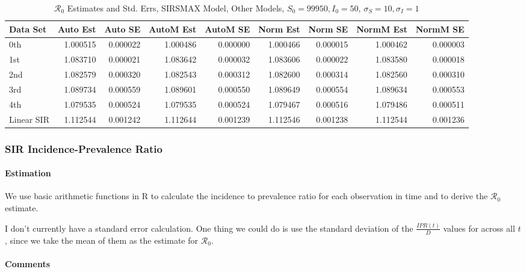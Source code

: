 \documentclass[12pt]{article}
\newcommand{\rr}{\ensuremath{\mathcal{R}_0}}
\begin{document}
\begin{table}[H]
	
	\caption{$\rr$ Estimates and Std. Errs, SIRSMAX Model,
		Other Models, $S_0 = 99950, I_0 = 50$, 
		$\sigma_S = 10, \sigma_I = 1$}
	\begin{footnotesize}
		\hskip -1cm
	\begin{tabular}{l|r|r|r|r|r|r|r|r}
		\hline
		Data Set & Auto Est & Auto SE & AutoM Est & AutoM SE & Norm Est & Norm SE & NormM Est & NormM SE\\
		\hline
		0th & 1.000515 & 0.000022 & 1.000486 & 0.000000 & 1.000466 & 0.000015 & 1.000462 & 0.000003\\
		\hline
		1st & 1.083710 & 0.000021 & 1.083642 & 0.000032 & 1.083606 & 0.000022 & 1.083580 & 0.000018\\
		\hline
		2nd & 1.082579 & 0.000320 & 1.082543 & 0.000312 & 1.082600 & 0.000314 & 1.082560 & 0.000310\\
		\hline
		3rd & 1.089734 & 0.000559 & 1.089601 & 0.000550 & 1.089649 & 0.000554 & 1.089634 & 0.000553\\
		\hline
		4th & 1.079535 & 0.000524 & 1.079535 & 0.000524 & 1.079467 & 0.000516 & 1.079486 & 0.000511\\
		\hline
		Linear SIR & 1.112544 & 0.001242 & 1.112644 & 0.001239 & 1.112546 & 0.001238 & 1.112544 & 0.001236\\
		\hline
	\end{tabular}
\end{footnotesize}
\end{table}

\subsubsection{SIR Incidence-Prevalence Ratio}

\paragraph{Estimation}

We use basic arithmetic functions in R to calculate the incidence to prevalence ratio for each observation in time and to derive the $\rr$ estimate. 

I don't currently have a standard error calculation. One thing we could do is use the standard deviation of the $\frac{IPR(t)}{D}$ values for across all $t$, since we take the mean of them as the estimate for $\rr$.  

\paragraph{Comments}
\end{document}
